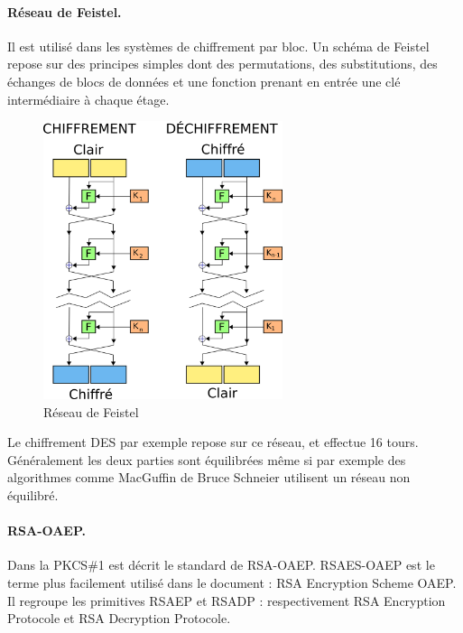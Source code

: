 \paragraph{Réseau de Feistel. \\}
Il est utilisé dans les systèmes de chiffrement par bloc. Un schéma de Feistel repose sur des principes simples dont des permutations, des substitutions, des échanges de blocs de données et une fonction prenant en entrée une clé intermédiaire à chaque étage.\\
\begin{figure}[H]
\centering
\includegraphics[width=7cm]{images/Reseau_de_feistel.png}
\caption{Réseau de Feistel}
\label{Feistel}
\end{figure}

Le chiffrement DES par exemple repose sur ce réseau, et effectue 16 tours.\\
Généralement les deux parties sont équilibrées même si par exemple des algorithmes comme MacGuffin de Bruce Schneier utilisent un réseau non équilibré.

\paragraph{RSA-OAEP. \\}
Dans la PKCS\#1 est décrit le standard de RSA-OAEP. RSAES-OAEP est le terme plus facilement utilisé dans le document : RSA Encryption Scheme OAEP.\\
Il regroupe les primitives RSAEP et RSADP : respectivement RSA Encryption Protocole et RSA Decryption Protocole.

